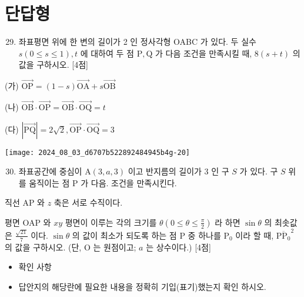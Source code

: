 \documentclass[10pt]{article}
\begin{document}
\section*{단답형}
\begin{enumerate}
  \setcounter{enumi}{28}
  \item 좌표평면 위에 한 변의 길이가 2 인 정사각형 OABC 가 있다. 두 실수 \(s(0 \leq s \leq 1), t\) 에 대하여 두 점 \(\mathrm{P}, \mathrm{Q}\) 가 다음 조건을 만족시킬 때, \(8(s+t)\) 의 값을 구하시오. [4점]
\end{enumerate}

(가) \(\overrightarrow{\mathrm{OP}}=(1-s) \overrightarrow{\mathrm{OA}}+s \overrightarrow{\mathrm{OB}}\)

(나) \(\overrightarrow{\mathrm{OB}} \cdot \overrightarrow{\mathrm{OP}}=\overrightarrow{\mathrm{OB}} \cdot \overrightarrow{\mathrm{OQ}}=t\)

(다) \(|\overrightarrow{\mathrm{PQ}}|=2 \sqrt{2}, \overrightarrow{\mathrm{OP}} \cdot \overrightarrow{\mathrm{OQ}}=3\)

\begin{center}
\texttt{[image: 2024\_08\_03\_d6707b522892484945b4g-20]}
\end{center}

\begin{enumerate}
  \setcounter{enumi}{29}
  \item 좌표공간에 중심이 \(\mathrm{A}(3, a, 3)\) 이고 반지름의 길이가 3 인 구 \(S\) 가 있다. 구 \(S\) 위를 움직이는 점 P 가 다음. 조건을 만족시킨다.
\end{enumerate}

직선 AP 와 \(z\) 축은 서로 수직이다.

평면 OAP 와 \(x y\) 평면이 이루는 각의 크기를 \(\theta\left(0 \leq \theta \leq \frac{\pi}{2}\right)\) 라 하면 \(\sin \theta\) 의 최솟값은 \(\frac{\sqrt{21}}{7}\) 이다. \(\sin \theta\) 의 값이 최소가 되도록 하는 점 P 중 하나를 \(\mathrm{P}_{0}\) 이라 할 때, \({\overline{\mathrm{PP}_{0}}}^{2}\) 의 값을 구하시오. (단, O 는 원점이고; \(a\) 는 상수이다.) [4점]

\begin{itemize}
  \item 확인 사항
\end{itemize}

\begin{itemize}
  \item 답안지의 해당란에 필요한 내용을 정확히 기입(표기)했는지 확인 하시오.
\end{itemize}
\end{document}
